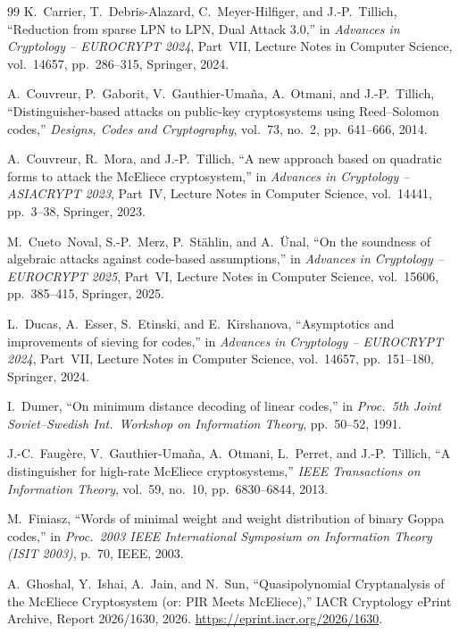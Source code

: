 \documentclass[11pt,a4paper]{article}
\theoremstyle{definition}
\theoremstyle{remark}
\begin{document}
\begin{thebibliography}{99}
K.~Carrier, T.~Debris-Alazard, C.~Meyer-Hilfiger, and J.-P.~Tillich,
``Reduction from sparse LPN to LPN, Dual Attack 3.0,'' in \emph{Advances in Cryptology -- EUROCRYPT 2024}, Part~VII, Lecture Notes in Computer Science, vol.~14657, pp.~286--315, Springer, 2024.

A.~Couvreur, P.~Gaborit, V.~Gauthier-Uma\~{n}a, A.~Otmani, and J.-P.~Tillich,
``Distinguisher-based attacks on public-key cryptosystems using Reed--Solomon codes,'' \emph{Designs, Codes and Cryptography}, vol.~73, no.~2, pp.~641--666, 2014.

A.~Couvreur, R.~Mora, and J.-P.~Tillich,
``A new approach based on quadratic forms to attack the McEliece cryptosystem,'' in \emph{Advances in Cryptology -- ASIACRYPT 2023}, Part~IV, Lecture Notes in Computer Science, vol.~14441, pp.~3--38, Springer, 2023.

M.~Cueto~Noval, S.-P.~Merz, P.~St\"{a}hlin, and A.~\"{U}nal,
``On the soundness of algebraic attacks against code-based assumptions,'' in \emph{Advances in Cryptology -- EUROCRYPT 2025}, Part~VI, Lecture Notes in Computer Science, vol.~15606, pp.~385--415, Springer, 2025.

L.~Ducas, A.~Esser, S.~Etinski, and E.~Kirshanova,
``Asymptotics and improvements of sieving for codes,'' in \emph{Advances in Cryptology -- EUROCRYPT 2024}, Part~VII, Lecture Notes in Computer Science, vol.~14657, pp.~151--180, Springer, 2024.

I.~Dumer,
``On minimum distance decoding of linear codes,'' in \emph{Proc.\ 5th Joint Soviet--Swedish Int.\ Workshop on Information Theory}, pp.~50--52, 1991.

J.-C.~Faug\`{e}re, V.~Gauthier-Uma\~{n}a, A.~Otmani, L.~Perret, and J.-P.~Tillich,
``A distinguisher for high-rate McEliece cryptosystems,'' \emph{IEEE Transactions on Information Theory}, vol.~59, no.~10, pp.~6830--6844, 2013.

M.~Finiasz,
``Words of minimal weight and weight distribution of binary Goppa codes,'' in \emph{Proc.\ 2003 IEEE International Symposium on Information Theory (ISIT 2003)}, p.~70, IEEE, 2003.

A.~Ghoshal, Y.~Ishai, A.~Jain, and N.~Sun,
``Quasipolynomial Cryptanalysis of the McEliece Cryptosystem (or: PIR Meets McEliece),'' IACR Cryptology ePrint Archive, Report 2026/1630, 2026. \url{https://eprint.iacr.org/2026/1630}.


\end{thebibliography}
\end{document}
